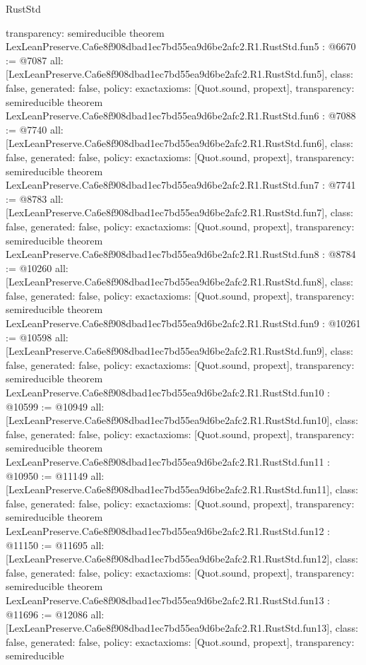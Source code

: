 \begin{lexlean}{RustStd}
\begin{coremodule}
{  transparency: semireducible
}
theorem LexLeanPreserve.Ca6e8f908dbad1ec7bd55ea9d6be2afc2.R1.RustStd.fun5 : @6670 := @7087 {
  all: [LexLeanPreserve.Ca6e8f908dbad1ec7bd55ea9d6be2afc2.R1.RustStd.fun5],
  class: false,
  generated: false,
  policy: exact{axioms: [Quot.sound, propext]},
  transparency: semireducible
}
theorem LexLeanPreserve.Ca6e8f908dbad1ec7bd55ea9d6be2afc2.R1.RustStd.fun6 : @7088 := @7740 {
  all: [LexLeanPreserve.Ca6e8f908dbad1ec7bd55ea9d6be2afc2.R1.RustStd.fun6],
  class: false,
  generated: false,
  policy: exact{axioms: [Quot.sound, propext]},
  transparency: semireducible
}
theorem LexLeanPreserve.Ca6e8f908dbad1ec7bd55ea9d6be2afc2.R1.RustStd.fun7 : @7741 := @8783 {
  all: [LexLeanPreserve.Ca6e8f908dbad1ec7bd55ea9d6be2afc2.R1.RustStd.fun7],
  class: false,
  generated: false,
  policy: exact{axioms: [Quot.sound, propext]},
  transparency: semireducible
}
theorem LexLeanPreserve.Ca6e8f908dbad1ec7bd55ea9d6be2afc2.R1.RustStd.fun8 : @8784 := @10260 {
  all: [LexLeanPreserve.Ca6e8f908dbad1ec7bd55ea9d6be2afc2.R1.RustStd.fun8],
  class: false,
  generated: false,
  policy: exact{axioms: [Quot.sound, propext]},
  transparency: semireducible
}
theorem LexLeanPreserve.Ca6e8f908dbad1ec7bd55ea9d6be2afc2.R1.RustStd.fun9 : @10261 := @10598 {
  all: [LexLeanPreserve.Ca6e8f908dbad1ec7bd55ea9d6be2afc2.R1.RustStd.fun9],
  class: false,
  generated: false,
  policy: exact{axioms: [Quot.sound, propext]},
  transparency: semireducible
}
theorem LexLeanPreserve.Ca6e8f908dbad1ec7bd55ea9d6be2afc2.R1.RustStd.fun10 : @10599 := @10949 {
  all: [LexLeanPreserve.Ca6e8f908dbad1ec7bd55ea9d6be2afc2.R1.RustStd.fun10],
  class: false,
  generated: false,
  policy: exact{axioms: [Quot.sound, propext]},
  transparency: semireducible
}
theorem LexLeanPreserve.Ca6e8f908dbad1ec7bd55ea9d6be2afc2.R1.RustStd.fun11 : @10950 := @11149 {
  all: [LexLeanPreserve.Ca6e8f908dbad1ec7bd55ea9d6be2afc2.R1.RustStd.fun11],
  class: false,
  generated: false,
  policy: exact{axioms: [Quot.sound, propext]},
  transparency: semireducible
}
theorem LexLeanPreserve.Ca6e8f908dbad1ec7bd55ea9d6be2afc2.R1.RustStd.fun12 : @11150 := @11695 {
  all: [LexLeanPreserve.Ca6e8f908dbad1ec7bd55ea9d6be2afc2.R1.RustStd.fun12],
  class: false,
  generated: false,
  policy: exact{axioms: [Quot.sound, propext]},
  transparency: semireducible
}
theorem LexLeanPreserve.Ca6e8f908dbad1ec7bd55ea9d6be2afc2.R1.RustStd.fun13 : @11696 := @12086 {
  all: [LexLeanPreserve.Ca6e8f908dbad1ec7bd55ea9d6be2afc2.R1.RustStd.fun13],
  class: false,
  generated: false,
  policy: exact{axioms: [Quot.sound, propext]},
  transparency: semireducible
}
\end{coremodule}
\end{lexlean}
